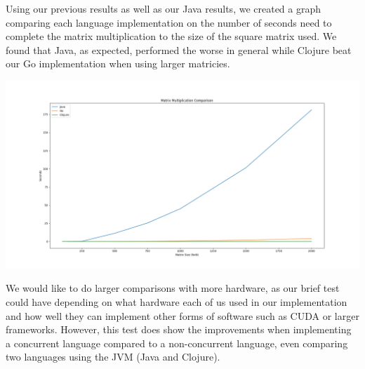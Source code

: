     Using our previous results as well as our Java results, we created a graph comparing each language implementation on the number of seconds need to complete the matrix multiplication to the size of the square matrix used. We found that Java, as expected, performed the worse in general while Clojure beat our Go implementation when using larger matricies.

    \includegraphics[width=\linewidth,keepaspectratio]{conclusion/comparison.png}

    We would like to do larger comparisons with more hardware, as our brief test could have depending on what hardware each of us used in our implementation and how well they can implement other forms of software such as CUDA or larger frameworks. However, this test does show the improvements when implementing a concurrent language compared to a non-concurrent language, even comparing two languages using the JVM (Java and Clojure).
